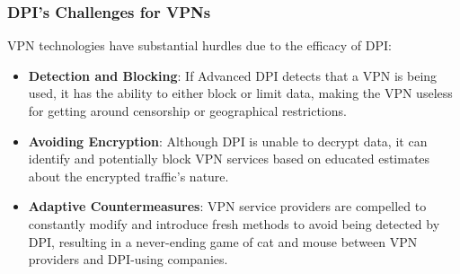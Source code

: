 \documentclass[12pt, fleqn, a4paper]{article}
\begin{document}
\subsubsection{DPI's Challenges for VPNs}
VPN technologies have substantial hurdles due to the efficacy of DPI:
\begin{itemize}
  \item \textbf{Detection and Blocking}: If Advanced DPI detects that a VPN is being used, it has the ability to either block or limit data, making the VPN useless for getting around censorship or geographical restrictions.
  \item \textbf{Avoiding Encryption}: Although DPI is unable to decrypt data, it can identify and potentially block VPN services based on educated estimates about the encrypted traffic's nature.
  \item \textbf{Adaptive Countermeasures}: VPN service providers are compelled to constantly modify and introduce fresh methods to avoid being detected by DPI, resulting in a never-ending game of cat and mouse between VPN providers and DPI-using companies.
\end{itemize}
\end{document}
